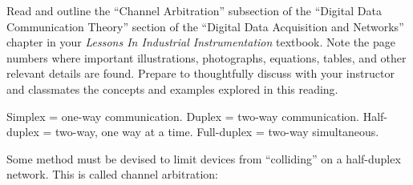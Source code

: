 

Read and outline the ``Channel Arbitration'' subsection of the ``Digital Data Communication Theory'' section of the ``Digital Data Acquisition and Networks'' chapter in your {\it Lessons In Industrial Instrumentation} textbook.  Note the page numbers where important illustrations, photographs, equations, tables, and other relevant details are found.  Prepare to thoughtfully discuss with your instructor and classmates the concepts and examples explored in this reading.














Simplex = one-way communication.  Duplex = two-way communication.  Half-duplex = two-way, one way at a time.  Full-duplex = two-way simultaneous.

\vskip 10pt

Some method must be devised to limit devices from ``colliding'' on a half-duplex network.  This is called channel arbitration:

